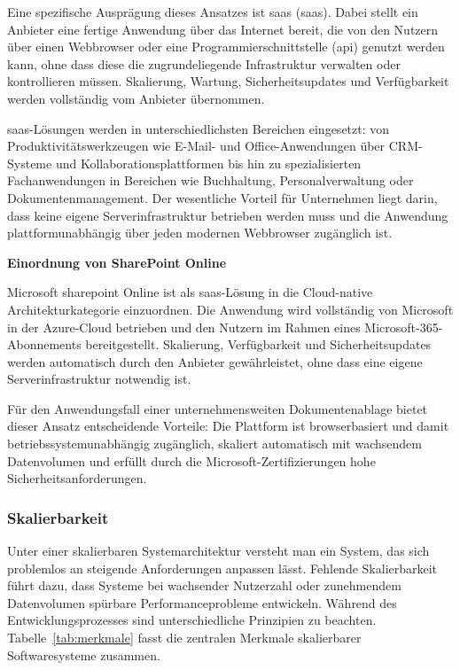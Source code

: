 Eine spezifische Ausprägung dieses Ansatzes ist \acrlong{saas} (\acrshort{saas}).
Dabei stellt ein Anbieter eine fertige Anwendung über das Internet bereit, die von
den Nutzern über einen Webbrowser oder eine Programmierschnittstelle (\acrshort{api}) genutzt werden
kann, ohne dass diese die zugrundeliegende Infrastruktur verwalten oder kontrollieren
müssen. \cite{mell2011nist}
Skalierung, Wartung, Sicherheitsupdates und Verfügbarkeit werden vollständig vom
Anbieter übernommen. \cite{liu2011nistarch,mell2011nist}

\acrshort{saas}-Lösungen werden in unterschiedlichsten Bereichen eingesetzt: von
Produktivitätswerkzeugen wie E-Mail- und Office-Anwendungen über CRM-Systeme und
Kollaborationsplattformen bis hin zu spezialisierten Fachanwendungen in Bereichen
wie Buchhaltung, Personalverwaltung oder Dokumentenmanagement.
Der wesentliche Vorteil für Unternehmen liegt darin, dass keine eigene
Serverinfrastruktur betrieben werden muss und die Anwendung plattformunabhängig
über jeden modernen Webbrowser zugänglich ist.
\cite{mell2011nist,liu2011nistarch}

\textbf{Einordnung von SharePoint Online}

Microsoft \gls{sharepoint} Online ist als \acrshort{saas}-Lösung in die Cloud-native
Architekturkategorie einzuordnen. Die Anwendung wird vollständig von Microsoft in
der Azure-Cloud betrieben und den Nutzern im Rahmen eines
Microsoft-365-Abonnements bereitgestellt.
Skalierung, Verfügbarkeit und Sicherheitsupdates werden automatisch durch den
Anbieter gewährleistet, ohne dass eine eigene Serverinfrastruktur notwendig ist.
\cite{Microsoft.2024.SharePointSupport}

Für den Anwendungsfall einer unternehmensweiten Dokumentenablage bietet dieser
Ansatz entscheidende Vorteile: Die Plattform ist browserbasiert und damit
betriebssystemunabhängig zugänglich, skaliert automatisch mit wachsendem
Datenvolumen und erfüllt durch die Microsoft-Zertifizierungen hohe
Sicherheitsanforderungen. \cite{Microsoft.2024.SharePointSupport}

\subsubsection{Skalierbarkeit}
 
Unter einer skalierbaren Systemarchitektur versteht man ein System, das sich
problemlos an steigende Anforderungen anpassen lässt. Fehlende Skalierbarkeit führt
dazu, dass Systeme bei wachsender Nutzerzahl oder zunehmendem Datenvolumen spürbare
Performanceprobleme entwickeln.
Während des Entwicklungsprozesses sind unterschiedliche Prinzipien zu beachten.
Tabelle~\ref{tab:merkmale} fasst die zentralen Merkmale skalierbarer
Softwaresysteme zusammen.
\cite{studysmarter2024skalierbare}
 
